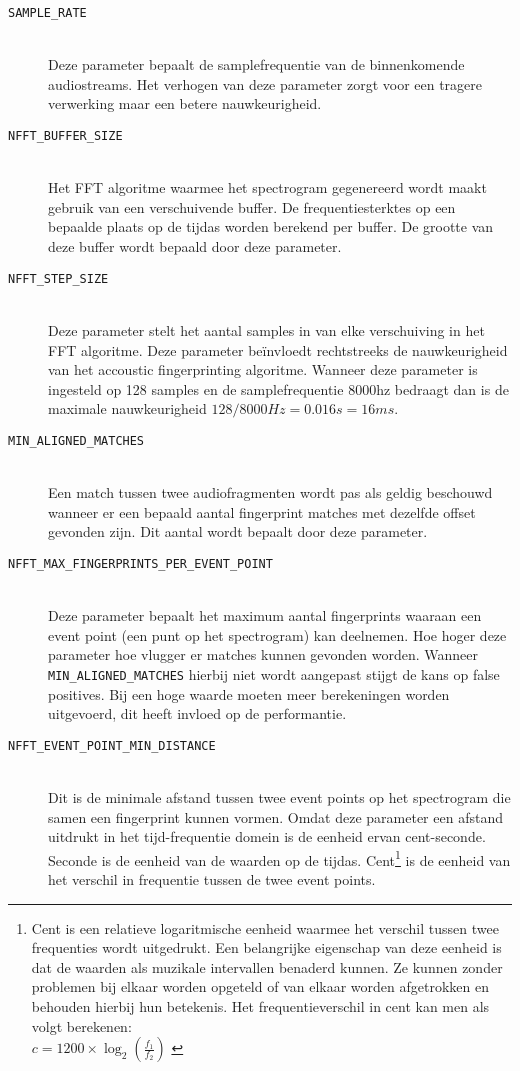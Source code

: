 \begin{description}
\item[\texttt{SAMPLE\_RATE}] \hfill \\
Deze parameter bepaalt de samplefrequentie van de binnenkomende audiostreams. Het verhogen van deze parameter zorgt voor een tragere verwerking maar een betere nauwkeurigheid.
\item[\texttt{NFFT\_BUFFER\_SIZE}] \hfill \\
Het FFT algoritme waarmee het spectrogram gegenereerd wordt maakt gebruik van een verschuivende buffer. De frequentiesterktes op een bepaalde plaats op de tijd\-as worden berekend per buffer. De grootte van deze buffer wordt bepaald door deze parameter.
\item[\texttt{NFFT\_STEP\_SIZE}] \hfill \\
Deze parameter stelt het aantal samples in van elke verschuiving in het FFT algoritme. Deze parameter beïnvloedt rechtstreeks de nauwkeurigheid van het accoustic fingerprinting algoritme. Wanneer deze parameter is ingesteld op 128 samples en de samplefrequentie 8000hz bedraagt dan is de maximale nauwkeurigheid $128/8000Hz = 0.016s = 16ms$.
\item[\texttt{MIN\_ALIGNED\_MATCHES}] \hfill \\
Een match tussen twee audiofragmenten wordt pas als geldig beschouwd wanneer er een bepaald aantal fingerprint matches met dezelfde offset gevonden zijn. Dit aantal wordt bepaalt door deze parameter.
\item[\texttt{NFFT\_MAX\_FINGERPRINTS\_PER\_EVENT\_POINT}] \hfill \\
Deze parameter bepaalt het maximum aantal fingerprints waaraan een event point (een punt op het spectrogram) kan deelnemen. Hoe hoger deze parameter hoe vlugger er matches kunnen gevonden worden. Wanneer \texttt{MIN\_ALIGNED\_MATCHES} hierbij niet wordt aangepast stijgt de kans op false positives. Bij een hoge waarde moeten meer berekeningen worden uitgevoerd, dit heeft invloed op de performantie.
\item[\texttt{NFFT\_EVENT\_POINT\_MIN\_DISTANCE}] \hfill \\
Dit is de minimale afstand tussen twee event points op het spectrogram die samen een fingerprint kunnen vormen. Omdat deze parameter een afstand uitdrukt in het tijd-frequentie domein is de eenheid ervan cent-seconde. Seconde is de eenheid van de waarden op de tijdas. Cent\footnote{Cent is een relatieve logaritmische eenheid waarmee het verschil tussen twee frequenties wordt uitgedrukt. Een belangrijke eigenschap van deze eenheid is dat de waarden als muzikale intervallen benaderd kunnen. Ze kunnen zonder problemen bij elkaar worden opgeteld of van elkaar worden afgetrokken en behouden hierbij hun betekenis. Het frequentieverschil in cent kan men als volgt berekenen:\\ 
\begin{math}
c = 1200 \times \log_{2}(\frac{f_{1}}{f_{2}})
\end{math} \cite{pitchrepresentation}} 
is de eenheid van het verschil in frequentie tussen de twee event points. 

\end{description}

